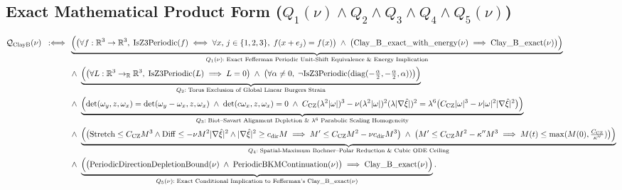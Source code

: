 \documentclass[11pt,a4paper]{article}
\theoremstyle{definition}
\begin{document}
\subsection{Exact Mathematical Product Form ($Q_1(\nu) \wedge Q_2 \wedge Q_3 \wedge Q_4 \wedge Q_5(\nu)$)}
\begin{equation}
\label{eq:master-product-clayb}
\begin{aligned}
\mathcal{Q}_{\mathrm{ClayB}}(\nu) \;\;:\Longleftrightarrow\;\;
&\underbrace{\Bigl(\bigl(\forall f:\mathbb{R}^3\to\mathbb{R}^3,\; \mathrm{IsZ3Periodic}(f) \iff \forall x,\, j\in\{1,2,3\},\; f(x+e_j)=f(x)\bigr) \;\wedge\; \bigl(\mathrm{Clay\_B\_exact\_with\_energy}(\nu) \implies \mathrm{Clay\_B\_exact}(\nu)\bigr)\Bigr)}_{Q_1(\nu):\;\text{Exact Fefferman Periodic Unit-Shift Equivalence \& Energy Implication}} \\
&\wedge\; \underbrace{\Bigl(\bigl(\forall L:\mathbb{R}^3\to_{\mathbb{R}}\mathbb{R}^3,\; \mathrm{IsZ3Periodic}(L) \implies L=0\bigr) \;\wedge\; \bigl(\forall \alpha\neq 0,\; \neg\mathrm{IsZ3Periodic}(\mathrm{diag}(-\tfrac{\alpha}{2},-\tfrac{\alpha}{2},\alpha))\bigr)\Bigr)}_{Q_2:\;\text{Torus Exclusion of Global Linear Burgers Strain}} \\
&\wedge\; \underbrace{\Bigl(\det(\omega_y,z,\omega_x)=\det(\omega_y-\omega_x,z,\omega_x) \;\wedge\; \det(c\omega_x,z,\omega_x)=0 \;\wedge\; C_{\mathrm{CZ}}(\lambda^2|\omega|)^3 - \nu(\lambda^2|\omega|)^2(\lambda|\nabla\hat{\xi}|)^2 = \lambda^6\bigl(C_{\mathrm{CZ}}|\omega|^3 - \nu|\omega|^2|\nabla\hat{\xi}|^2\bigr)\Bigr)}_{Q_3:\;\text{Biot--Savart Alignment Depletion \& }\lambda^6\text{ Parabolic Scaling Homogeneity}} \\
&\wedge\; \underbrace{\Bigl(\bigl(\mathrm{Stretch}\le C_{\mathrm{CZ}}M^3 \wedge \mathrm{Diff}\le -\nu M^2|\nabla\hat{\xi}|^2 \wedge |\nabla\hat{\xi}|^2\ge c_{\mathrm{dir}}M \implies M'\le C_{\mathrm{CZ}}M^2 - \nu c_{\mathrm{dir}}M^3\bigr) \;\wedge\; \bigl(M'\le C_{\mathrm{CZ}}M^2 - \kappa'' M^3 \implies M(t)\le\max(M(0),\tfrac{C_{\mathrm{CZ}}}{\kappa''})\bigr)\Bigr)}_{Q_4:\;\text{Spatial-Maximum Bochner--Polar Reduction \& Cubic ODE Ceiling}} \\
&\wedge\; \underbrace{\Bigl(\bigl(\mathrm{PeriodicDirectionDepletionBound}(\nu) \;\wedge\; \mathrm{PeriodicBKMContinuation}(\nu)\bigr) \implies \mathrm{Clay\_B\_exact}(\nu)\Bigr)}_{Q_5(\nu):\;\text{Exact Conditional Implication to Fefferman's }\mathrm{Clay\_B\_exact}(\nu)}.
\end{aligned}
\end{equation}
\end{document}
